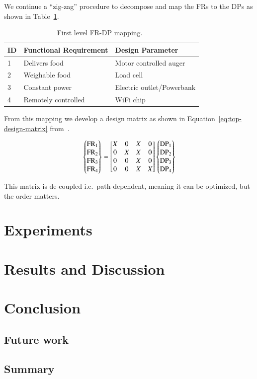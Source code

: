 \documentclass[twocolumn]{webofc}
\begin{document}
We continue a ``zig-zag'' procedure to decompose and map the FRs to the DPs as shown in Table~\ref{tab:first_level-frdp}.

\begin{table}
  \center
  \caption{First level FR-DP mapping.~\cite{gerhard2016suretrack}}\label{tab:first_level-frdp}
  \begin{tabular}{lll} \toprule
    ID& Functional Requirement & Design Parameter \\ \midrule 
    1&Delivers food&Motor controlled auger\\
    2&Weighable food&Load cell\\
    3&Constant power &Electric outlet/Powerbank\\
    4&Remotely controlled&WiFi chip\\
    \bottomrule
  \end{tabular}
\end{table}

From this mapping we develop a design matrix as shown in Equation~\ref{eq:top-design-matrix} from~\cite{gerhard2016suretrack}.

\begin{equation}\label{eq:top-design-matrix}
\begin{Bmatrix}
\text{FR}_{1}\\
\text{FR}_{2}\\
\text{FR}_{3}\\
\text{FR}_{4}
\end{Bmatrix}=
\begin{bmatrix}
X & 0 & X & 0\\
0 & X & X & 0\\
0 & 0 & X & 0\\
0 & 0 & X & X
\end{bmatrix}
\begin{Bmatrix}
\text{DP}_{1}\\
\text{DP}_{2}\\
\text{DP}_{3}\\
\text{DP}_{4}

\end{Bmatrix}
\end{equation}

This matrix is de-coupled i.e.\ path-dependent, meaning it can be optimized, but the order matters.

\section{Experiments}

\section{Results and Discussion}

\section{Conclusion}

\subsection{Future work}

\subsection{Summary}

%

\end{document}
